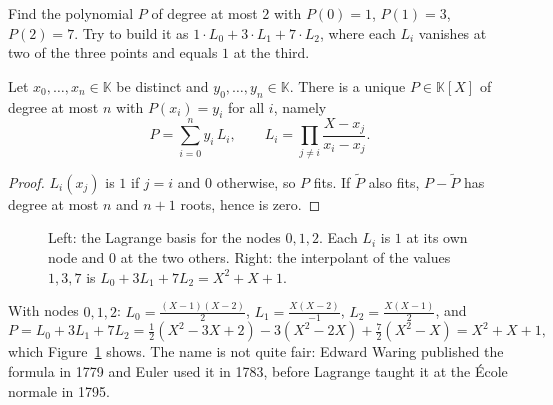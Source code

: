 \begin{think}
Find the polynomial $P$ of degree at most $2$ with $P(0)=1$, $P(1)=3$, $P(2)=7$. Try to build it as $1\cdot L_0+3\cdot L_1+7\cdot L_2$, where each $L_i$ vanishes at two of the three points and equals $1$ at the third.
\end{think}

\begin{theorem}[Lagrange]\label{thm:lagrange}
Let $x_0,\dots,x_n\in\mathbb K$ be distinct and $y_0,\dots,y_n\in\mathbb K$. There is a unique $P\in\mathbb K[X]$ of degree at most $n$ with $P(x_i)=y_i$ for all $i$, namely
\[
P=\sum_{i=0}^ny_i\,L_i,\qquad L_i=\prod_{j\ne i}\frac{X-x_j}{x_i-x_j}.
\]
\end{theorem}
\begin{proof}
$L_i(x_j)$ is $1$ if $j=i$ and $0$ otherwise, so $P$ fits. If $\tilde P$ also fits, $P-\tilde P$ has degree at most $n$ and $n+1$ roots, hence is zero.
\end{proof}

\begin{figure}[ht]
\centering
{}
\caption{Left: the Lagrange basis for the nodes $0,1,2$. Each $L_i$ is $1$ at its own node and $0$ at the two others. Right: the interpolant of the values $1,3,7$ is $L_0+3L_1+7L_2=X^2+X+1$.}
\label{fig:lagrange}
\end{figure}

\begin{examplex}
With nodes $0,1,2$: $L_0=\frac{(X-1)(X-2)}2$, $L_1=\frac{X(X-2)}{-1}$, $L_2=\frac{X(X-1)}2$, and
\[
P=L_0+3L_1+7L_2=\tfrac12(X^2-3X+2)-3(X^2-2X)+\tfrac72(X^2-X)=X^2+X+1,
\]
which Figure~\ref{fig:lagrange} shows. The name is not quite fair: Edward Waring published the formula in 1779 and Euler used it in 1783, before
Lagrange taught it at the \'Ecole normale in 1795.
\end{examplex}

